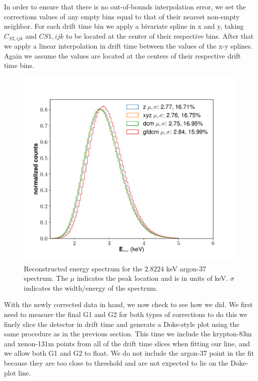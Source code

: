 In order to ensure that there is no out-of-bounds interpolation error, we set the corrections values of any empty bins equal to that of their nearest non-empty neighbor. For each drift time bin we apply a bivariate spline in x and y, taking $C_{S2,ijk}$ and $C{S1,ijk}$ to be located at the center of their respective bins. After that we apply a linear interpolation in drift time between the values of the x-y splines. Again we assume the values are located at the centers of their respective drift time bins.
\begin{figure}[h!]
\centering
  \includegraphics[width=\textwidth]{Figures/E_spec_Ar.pdf}
  \caption{Reconstructed energy spectrum for the 2.8224 keV argon-37 spectrum. The $\mu$ indicates the peak location and is in units of keV. $\sigma$ indicates the width/energy of the spectrum.}
\label{fig:E_spec_Ar} 
\end{figure}

With the newly corrected data in hand, we now check to see how we did. We first need to measure the final G1 and G2 for both types of corrections to do this we finely slice the detector in drift time and generate a Doke-style plot using the same procedure as in the previous section. This time we include the krypton-83m and xenon-131m points from all of the drift time slices when fitting our line, and we allow both G1 and G2 to float. We do not include the argon-37 point in the fit because they are too close to threshold and are not expected to lie on the Doke-plot line. 

